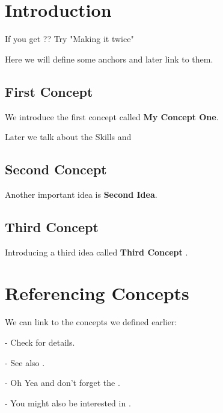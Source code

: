 \documentclass[12pt]{article}
\newcommand{\MakeBoldAnchor}[1]{%
  \textbf{#1}\MakeAnchor{#1}%
}
\begin{document}
\section{Introduction}

If you get ?? Try "Making it twice"

Here we will define some anchors and later link to them.

\subsection{First Concept}

We introduce the first concept called \textbf{My Concept One}.

\lipsum[1]

Later we talk about the Skills  and 

\newpage

\subsection{Second Concept}

Another important idea is \textbf{Second Idea}.

\lipsum[2]
\newpage

\subsection{Third Concept}

Introducing a third idea called \MakeBoldAnchor{Third Concept}.

\lipsum[3]
\newpage

\section{Referencing Concepts}

We can link to the concepts we defined earlier:

- Check  for details.

- See also .

- Oh Yea and don't forget the .

- You might also be interested in .

\lipsum[3]
\newpage

\printindex
\end{document}
